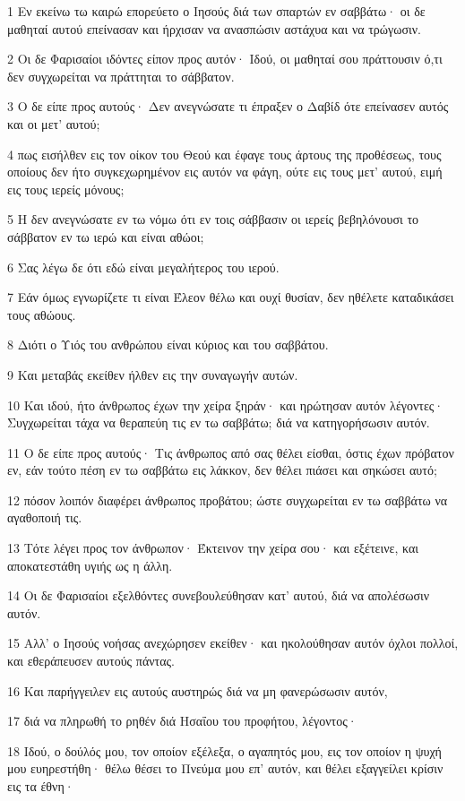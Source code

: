 \par 1 Εν εκείνω τω καιρώ επορεύετο ο Ιησούς διά των σπαρτών εν σαββάτω· οι δε μαθηταί αυτού επείνασαν και ήρχισαν να ανασπώσιν αστάχυα και να τρώγωσιν.
\par 2 Οι δε Φαρισαίοι ιδόντες είπον προς αυτόν· Ιδού, οι μαθηταί σου πράττουσιν ό,τι δεν συγχωρείται να πράττηται το σάββατον.
\par 3 Ο δε είπε προς αυτούς· Δεν ανεγνώσατε τι έπραξεν ο Δαβίδ ότε επείνασεν αυτός και οι μετ' αυτού;
\par 4 πως εισήλθεν εις τον οίκον του Θεού και έφαγε τους άρτους της προθέσεως, τους οποίους δεν ήτο συγκεχωρημένον εις αυτόν να φάγη, ούτε εις τους μετ' αυτού, ειμή εις τους ιερείς μόνους;
\par 5 Η δεν ανεγνώσατε εν τω νόμω ότι εν τοις σάββασιν οι ιερείς βεβηλόνουσι το σάββατον εν τω ιερώ και είναι αθώοι;
\par 6 Σας λέγω δε ότι εδώ είναι μεγαλήτερος του ιερού.
\par 7 Εάν όμως εγνωρίζετε τι είναι Έλεον θέλω και ουχί θυσίαν, δεν ηθέλετε καταδικάσει τους αθώους.
\par 8 Διότι ο Υιός του ανθρώπου είναι κύριος και του σαββάτου.
\par 9 Και μεταβάς εκείθεν ήλθεν εις την συναγωγήν αυτών.
\par 10 Και ιδού, ήτο άνθρωπος έχων την χείρα ξηράν· και ηρώτησαν αυτόν λέγοντες· Συγχωρείται τάχα να θεραπεύη τις εν τω σαββάτω; διά να κατηγορήσωσιν αυτόν.
\par 11 Ο δε είπε προς αυτούς· Τις άνθρωπος από σας θέλει είσθαι, όστις έχων πρόβατον εν, εάν τούτο πέση εν τω σαββάτω εις λάκκον, δεν θέλει πιάσει και σηκώσει αυτό;
\par 12 πόσον λοιπόν διαφέρει άνθρωπος προβάτου; ώστε συγχωρείται εν τω σαββάτω να αγαθοποιή τις.
\par 13 Τότε λέγει προς τον άνθρωπον· Έκτεινον την χείρα σου· και εξέτεινε, και αποκατεστάθη υγιής ως η άλλη.
\par 14 Οι δε Φαρισαίοι εξελθόντες συνεβουλεύθησαν κατ' αυτού, διά να απολέσωσιν αυτόν.
\par 15 Αλλ' ο Ιησούς νοήσας ανεχώρησεν εκείθεν· και ηκολούθησαν αυτόν όχλοι πολλοί, και εθεράπευσεν αυτούς πάντας.
\par 16 Και παρήγγειλεν εις αυτούς αυστηρώς διά να μη φανερώσωσιν αυτόν,
\par 17 διά να πληρωθή το ρηθέν διά Ησαΐου του προφήτου, λέγοντος·
\par 18 Ιδού, ο δούλός μου, τον οποίον εξέλεξα, ο αγαπητός μου, εις τον οποίον η ψυχή μου ευηρεστήθη· θέλω θέσει το Πνεύμα μου επ' αυτόν, και θέλει εξαγγείλει κρίσιν εις τα έθνη·
